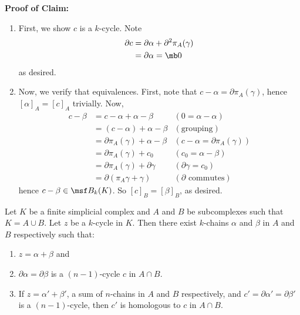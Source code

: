 \begin{solution}
  \textbf{Proof of Claim:}
  \begin{enumerate}
    \item First, we show $c$ is a $k$-cycle. Note
      \begin{align*}
        \partial c
        &= \partial \alpha + \partial^2 \pi_A(\gamma) \\
        &= \partial \alpha = \mb 0
      \end{align*}
      as desired.
    \item Now, we verify that equivalences. First, note that $c-\alpha
      = \partial \pi_A(\gamma)$, hence $[\alpha]_A = [c]_A$ trivially.
      Now,
      \begin{align*}
        c-\beta
        &= c - \alpha + \alpha - \beta & (0=\alpha - \alpha)\\
        &= (c-\alpha) + \alpha - \beta & (\text{grouping})\\
        &= \partial \pi_A(\gamma) + \alpha - \beta & (c-\alpha=\partial \pi_A(\gamma))\\
        &= \partial \pi_A(\gamma) + c_0 & (c_0 = \alpha - \beta)\\
        &= \partial \pi_A(\gamma) + \partial \gamma & (\partial \gamma = c_0)\\
        &= \partial (\pi_A\gamma + \gamma) & (\partial \text{ commutes})
      \end{align*}
      hence $c - \beta \in \msf B_k(K)$. So $[c]_B = [\beta]_B$, as
      desired.
  \end{enumerate}
\end{solution}

\begin{problem}[16.34]
  Let $K$ be a finite simplicial complex and $A$ and $B$ be
  subcomplexes such that  $K=A\cup B$. Let $z$ be a $k$-cycle in $K$.
  Then there exist $k$-chains $\alpha$ and $\beta$ in $A$ and $B$
  respectively such that:
  \begin{enumerate}[label=(\arabic*)]
    \item $z=\alpha+\beta$ and
    \item $\partial \alpha=\partial \beta$ is a $(n-1)$-cycle $c$ in
      $A\cap B$.
    \item If $z= \alpha'+\beta'$, a sum of $n$-chains in $A$ and $B$
      respectively, and $c'= \partial \alpha' = \partial \beta'$ is a
      $(n-1)$-cycle, then $c'$ is homologous to $c$ in $A \cap B$.
  \end{enumerate}
\end{problem}

